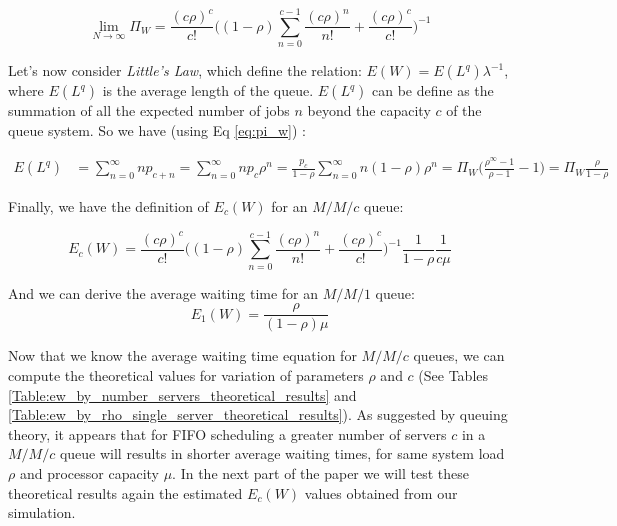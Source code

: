 \documentclass{article}
\begin{document}
    \begin{equation}
        \lim_{N\to\infty} \Pi_W = \frac{(c \rho)^c}{c !} \Big((1 - \rho) \sum_{n = 0}^{c-1}\frac{(c \rho)^n}{n !} + \frac{(c \rho)^c}{c !} \Big)^{-1}
    \end{equation}

    Let's now consider \emph{Little's Law}, which define the relation: $E(W) = E(L^q) \lambda^{-1}$, where $E(L^q)$ is the average length of the queue.
    $E(L^q)$ can be define as the summation of all the expected number of jobs $n$ beyond the capacity $c$ of the queue system. So we have (using Eq \ref{eq:pi_w}) :

    \begin{align}
        E(L^q) &= \sum_{n=0}^{\infty} n p_{c + n} = \sum_{n=0}^{\infty} n p_c \rho^n = \frac{p_c}{1 - \rho} \sum_{n=0}^{\infty} n (1 - \rho) \rho^n = \Pi_W \Big(\frac{\rho^{\infty} - 1}{\rho - 1} - 1 \Big) = \Pi_W \frac{\rho}{1 - \rho}
    \end{align}

    Finally, we have the definition of $E_c(W)$ for an $M/M/c$ queue:

    \begin{equation}
        E_c(W) = \frac{(c \rho)^c}{c !} \Big((1 - \rho) \sum_{n = 0}^{c-1}\frac{(c \rho)^n}{n !} + \frac{(c \rho)^c}{c !} \Big)^{-1} \frac{1}{1 - \rho} \frac{1}{c \mu}
    \end{equation}

    And we can derive the average waiting time for an $M/M/1$ queue:
    \begin{equation}
        E_1(W) =  \frac{\rho}{(1 - \rho)\mu}
    \end{equation}

    Now that we know the average waiting time equation for $M/M/c$ queues, we can compute the theoretical values for variation of parameters $\rho$ and $c$ (See Tables \ref{Table:ew_by_number_servers_theoretical_results} and \ref{Table:ew_by_rho_single_server_theoretical_results}).
    As suggested by queuing theory, it appears that for FIFO scheduling a greater number of servers $c$ in a $M/M/c$ queue will results in shorter average waiting times, for same system load $\rho$ and processor capacity $\mu$.
    In the next part of the paper we will test these theoretical results again the estimated $E_c(W)$ values obtained from our simulation.
\end{document}
